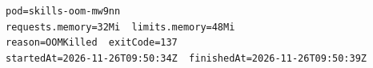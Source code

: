 \begin{Verbatim}[fontsize=\scriptsize]
pod=skills-oom-mw9nn
requests.memory=32Mi  limits.memory=48Mi
reason=OOMKilled  exitCode=137
startedAt=2026-11-26T09:50:34Z  finishedAt=2026-11-26T09:50:39Z
\end{Verbatim}
